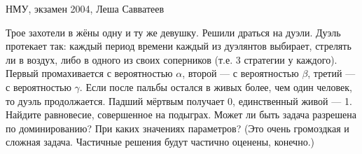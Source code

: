 














\begin{problem}[Дуэль.]
\begin{source}
НМУ, экзамен 2004, Леша Савватеев
\end{source}
Трое захотели в жёны одну и ту же девушку. Решили драться на дуэли. Дуэль протекает так: каждый период времени каждый из дуэлянтов выбирает, стрелять ли в воздух, либо в одного из своих соперников (т.е. 3 стратегии у каждого). Первый промахивается с вероятностью $\alpha$, второй --- с вероятностью $\beta$, третий --- с вероятностью $\gamma$. Если после пальбы остался в живых более, чем один человек, то дуэль продолжается. Падший мёртвым получает 0, единственный живой --- 1. Найдите равновесие, совершенное на подыграх. Может ли быть задача разрешена по доминированию? При каких значениях параметров? (Это очень громоздкая и сложная задача. Частичные решения будут частично оценены, конечно.)

\begin{sol}

\end{sol}
\end{problem}




